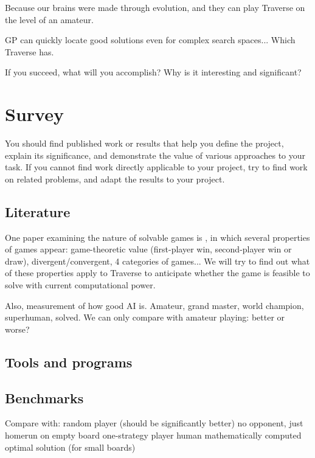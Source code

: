 \documentclass[times, 10pt,twocolumn]{article}
\begin{document}
Because our brains were made through evolution, and they can play Traverse on the level of an amateur.

GP can quickly locate good solutions even for complex search spaces... Which Traverse has.


If you succeed, what will you accomplish? Why is it interesting and significant?


\section{Survey}
You should find published work or results that help you define the project, explain its significance, and demonstrate the value of various approaches to your task. If you cannot find work directly applicable to your project, try to find work on related problems, and adapt the results to your project.

\subsection{Literature}
One paper examining the nature of solvable games is \cite{games_solved}, in which several properties of games appear: game-theoretic value (first-player win, second-player win or draw), divergent/convergent, 4 categories of games... We will try to find out what of these properties apply to Traverse to anticipate whether the game is feasible to solve with current computational power.

Also, measurement of how good AI is. Amateur, grand master, world champion, superhuman, solved. We can only compare with amateur playing: better or worse?

\subsection{Tools and programs}

\subsection{Benchmarks}

Compare with:
random player (should be significantly better)
no opponent, just homerun on empty board
one-strategy player
human
mathematically computed optimal solution (for small boards)
\end{document}
